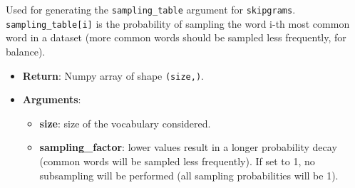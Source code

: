 \begin{Shaded}
\begin{Highlighting}[]
\OperatorTok{=}\NormalTok{)}
\end{Highlighting}
\end{Shaded}

Used for generating the \texttt{sampling\_table} argument for
\texttt{skipgrams}. \texttt{sampling\_table{[}i{]}} is the probability
of sampling the word i-th most common word in a dataset (more common
words should be sampled less frequently, for balance).

\begin{itemize}
\item
  \textbf{Return}: Numpy array of shape \texttt{(size,)}.
\item
  \textbf{Arguments}:

  \begin{itemize}
  \tightlist
  \item
    \textbf{size}: size of the vocabulary considered.
  \item
    \textbf{sampling\_factor}: lower values result in a longer
    probability decay (common words will be sampled less frequently). If
    set to 1, no subsampling will be performed (all sampling
    probabilities will be 1).
  \end{itemize}
\end{itemize}
\newpage
